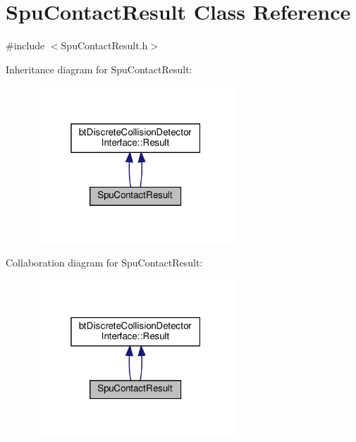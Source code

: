 \hypertarget{classSpuContactResult}{}\section{Spu\+Contact\+Result Class Reference}
\label{classSpuContactResult}


{\ttfamily \#include $<$Spu\+Contact\+Result.\+h$>$}



Inheritance diagram for Spu\+Contact\+Result\+:
\nopagebreak
\begin{figure}[H]
\begin{center}
\leavevmode
\includegraphics[width=217pt]{classSpuContactResult__inherit__graph}
\end{center}
\end{figure}


Collaboration diagram for Spu\+Contact\+Result\+:
\nopagebreak
\begin{figure}[H]
\begin{center}
\leavevmode
\includegraphics[width=217pt]{classSpuContactResult__coll__graph}
\end{center}
\end{figure}
